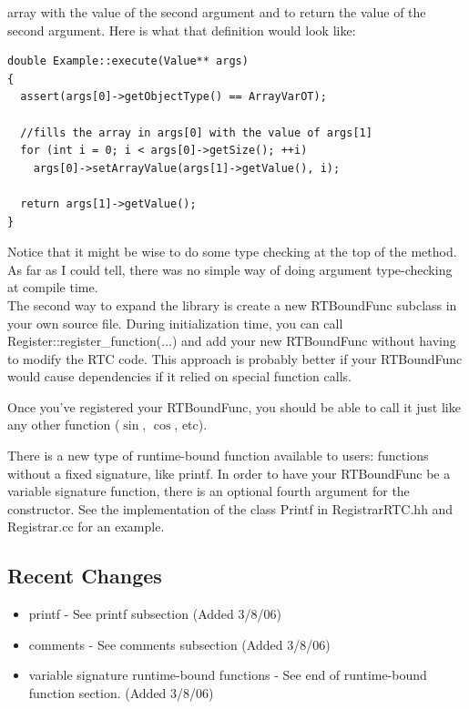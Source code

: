 \documentclass{article}
\begin{document}
array with the value of the second argument and to return the value of the
second argument. Here is what that definition would look like:
{\ttfamily \begin{verbatim}
double Example::execute(Value** args) 
{
  assert(args[0]->getObjectType() == ArrayVarOT);

  //fills the array in args[0] with the value of args[1]
  for (int i = 0; i < args[0]->getSize(); ++i) 
    args[0]->setArrayValue(args[1]->getValue(), i);

  return args[1]->getValue();
}
\end{verbatim} }
\noindent
Notice that it might be wise to do some type checking at the top of the 
method. As far as I could tell, there was no simple way of doing argument
type-checking at compile time. \\

\noindent
The second way to expand the library is create a new RTBoundFunc subclass in
your own source file. During initialization time, you can call 
Register::register\_function(...) and add your new RTBoundFunc without having
to modify the RTC code. This approach is probably better if your RTBoundFunc
would cause dependencies if it relied on special function calls. 

\noindent
Once you've registered your RTBoundFunc, you should be able to call it just 
like any other function ($\sin$, $\cos$, etc).

\noindent
There is a new type of runtime-bound function available to users: functions
without a fixed signature, like printf. In order to have your RTBoundFunc be
a variable signature function, there is an optional fourth argument for the
constructor. See the implementation of the class Printf in RegistrarRTC.hh and
Registrar.cc for an example.

\subsection{Recent Changes}

\begin{itemize}
  \item printf - See printf subsection (Added 3/8/06)
  \item comments - See comments subsection (Added 3/8/06)
  \item variable signature runtime-bound functions - See end of runtime-bound 
        function section. (Added 3/8/06)
\end{itemize}
\end{document}
